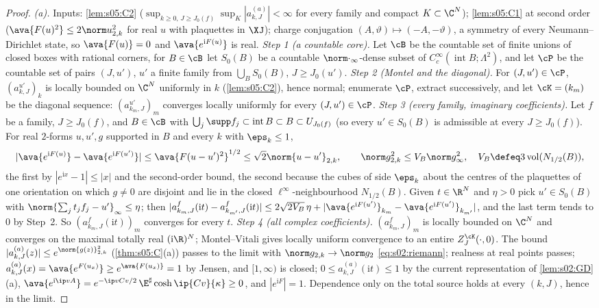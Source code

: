 \begin{proof}
\emph{(a).} Inputs: \cref{lem:s05:C2} ($\sup_{k\ge0,\,J\ge J_0(f)}\sup_K|a^{(a)}_{k,J}|<\infty$ for every family and compact $K\subset\C^N$); \cref{lem:s05:C1} at second order ($\ava{F(u)^2}\le2\norm u^2_{2,k}$ for real $u$ with plaquettes in $\XJ$); charge conjugation $(A,\vartheta)\mapsto(-A,-\vartheta)$, a symmetry of every Neumann--Dirichlet state, so $\ava{F(u)}=0$ and $\ava{e^{\mathrm iF(u)}}$ is real.
\emph{Step 1 (a countable core).} Let $\cB$ be the countable set of finite unions of closed boxes with rational corners, for $B\in\cB$ let $S_0(B)$ be a countable $\norm\cdot_\infty$-dense subset of $C^\infty_c(\operatorname{int}B;\Lambda^2)$, and let $\cP$ be the countable set of pairs $(J,u')$, $u'$ a finite family from $\bigcup_BS_0(B)$, $J\ge J_0(u')$.
\emph{Step 2 (Montel and the diagonal).} For $(J,u')\in\cP$, $(a^{u'}_{k,J})_k$ is locally bounded on $\C^N$ uniformly in $k$ (\cref{lem:s05:C2}), hence normal; enumerate $\cP$, extract successively, and let $\cK=(k_m)$ be the diagonal sequence: $(a^{u'}_{k_m,J})_m$ converges locally uniformly for every $(J,u')\in\cP$.
\emph{Step 3 (every family, imaginary coefficients).} Let $f$ be a family, $J\ge J_0(f)$, and $B\in\cB$ with $\bigcup_j\supp f_j\subset\operatorname{int}B\subset B\subset U_{J_0(f)}$ (so every $u'\in S_0(B)$ is admissible at every $J\ge J_0(f)$). For real $2$-forms $u,u',g$ supported in $B$ and every $k$ with $\eps_k\le1$,
\[
|\ava{e^{\mathrm iF(u)}}-\ava{e^{\mathrm iF(u')}}|\le{\ava{F(u-u')^2}}^{1/2}\le\sqrt2\norm{u-u'}_{2,k},\qquad \norm g^2_{2,k}\le V_B\norm g_\infty^2,\quad V_B\defeq3\operatorname{vol}(N_{1/2}(B)),
\]
the first by $|e^{\mathrm ix}-1|\le|x|$ and the second-order bound, the second because the cubes of side $\eps_k$ about the centres of the plaquettes of one orientation on which $g\ne0$ are disjoint and lie in the closed $\ell^\infty$-neighbourhood $N_{1/2}(B)$. Given $t\in\R^N$ and $\eta>0$ pick $u'\in S_0(B)$ with $\norm{\sum_jt_jf_j-u'}_\infty\le\eta$; then $|a^f_{k_m,J}(\mathrm it)-a^f_{k_{m'},J}(\mathrm it)|\le2\sqrt{2V_B}\,\eta+|{\ava{e^{\mathrm iF(u')}}}_{k_m}-{\ava{e^{\mathrm iF(u')}}}_{k_{m'}}|$, and the last term tends to $0$ by Step~2. So $(a^f_{k_m,J}(\mathrm it))_m$ converges for every $t$.
\emph{Step 4 (all complex coefficients).} $(a^f_{k_m,J})_m$ is locally bounded on $\C^N$ and converges on the maximal totally real $(\mathrm i\R)^N$; Montel--Vitali gives locally uniform convergence to an entire $Z^{\cK}_J(\cdot,0)$. The bound $|a^{(a)}_{k,J}(z)|\le e^{\norm{g(z)}^2_{2,k}}$ (\cref{thm:s05:C}(a)) passes to the limit with $\norm g_{2,k}\to\norm g_2$ \eqref{eq:s02:riemann}; realness at real points passes; $a^{(a)}_{k,J}(x)=\ava{e^{F(u_x)}}\ge e^{\ava{F(u_x)}}=1$ by Jensen, and $[1,\infty)$ is closed; $0\le a^{(a)}_{k,J}(\mathrm it)\le1$ by the current representation of \cref{lem:s02:GD}(a), $\ava{e^{\mathrm i\ip vA}}=e^{-\ip v{Cv}/2}\,\E^\sharp\cosh\ip{Cv}{\kappa}\ge0$, and $|e^{\mathrm iF}|=1$. Dependence only on the total source holds at every $(k,J)$, hence in the limit.

\end{proof}
